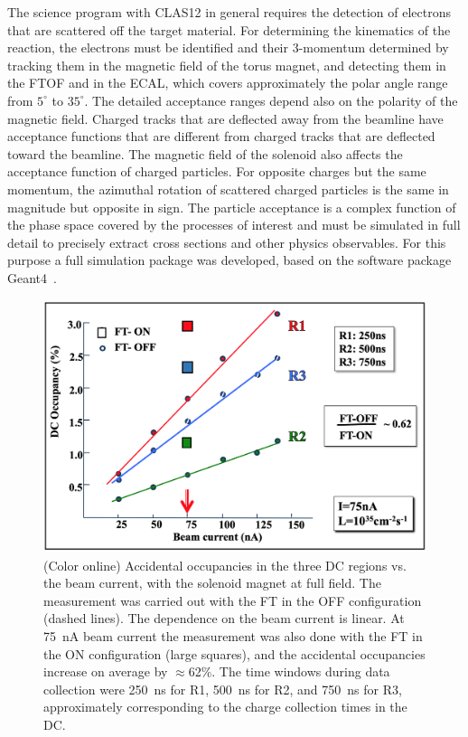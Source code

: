 \documentclass[final,3p,twocolumn]{elsarticle}
\begin{document}
The science program with CLAS12 in general requires the detection of electrons that are scattered off the target
material. For determining the kinematics of the reaction, the electrons must be identified and their 3-momentum
determined by tracking them in the magnetic field of the torus magnet, and detecting them in the FTOF and in the
ECAL, which covers approximately the polar angle range from $5^\circ$ to $35^\circ$. The detailed acceptance
ranges depend also on the polarity of the magnetic field. Charged tracks that are deflected away from the beamline
have acceptance functions that are different from charged tracks that are deflected toward the beamline. The
magnetic field of the solenoid also affects the acceptance function of charged particles. For opposite charges but
the same momentum, the azimuthal rotation of scattered charged particles is the same in magnitude but opposite in
sign. The particle acceptance is a complex function of the phase space covered by the processes of interest and 
must be simulated in full detail to precisely extract cross sections and other physics observables.  For this purpose 
a full simulation package was developed, based on the software package Geant4~\cite{GEMC}. 

\begin{figure}[htbp!]
\centerline{\includegraphics[width=1.0\columnwidth]{random-occupancies.png}}
\caption{(Color online) Accidental occupancies in the three DC regions vs. the beam current, with the solenoid magnet at full field.
  The measurement was carried out with the FT in the OFF configuration (dashed lines). The dependence on the beam
  current is linear. At 75~nA beam current the measurement was also done with the FT in the ON configuration (large
  squares), and the accidental occupancies increase on average by $\approx$62\%. The time windows during data
  collection were 250~ns for R1, 500~ns for R2, and 750~ns for R3, approximately corresponding to the charge
  collection times in the DC.}
\label{occupancies1}
\end{figure}
\end{document}
